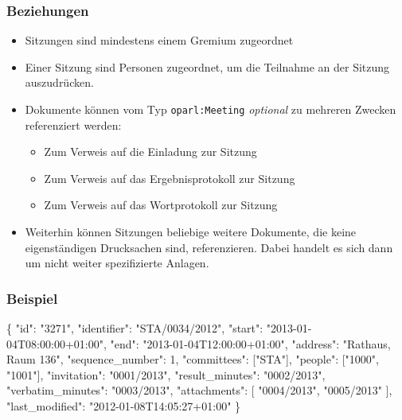 \documentclass[,a4paper]{article}
\newenvironment{Shaded}{}{}
\newcommand{\DataTypeTok}[1]{\textcolor[rgb]{0.56,0.13,0.00}{{#1}}}
\newcommand{\DecValTok}[1]{\textcolor[rgb]{0.25,0.63,0.44}{{#1}}}
\newcommand{\StringTok}[1]{\textcolor[rgb]{0.25,0.44,0.63}{{#1}}}
\newcommand{\NormalTok}[1]{{#1}}
\begin{document}
\subsubsection{Beziehungen}

\begin{itemize}
\item
  Sitzungen sind mindestens einem Gremium zugeordnet
\item
  Einer Sitzung sind Personen zugeordnet, um die Teilnahme an der
  Sitzung auszudrücken.
\item
  Dokumente können vom Typ \texttt{oparl:Meeting} \emph{optional} zu
  mehreren Zwecken referenziert werden:

  \begin{itemize}
  \item
    Zum Verweis auf die Einladung zur Sitzung
  \item
    Zum Verweis auf das Ergebnisprotokoll zur Sitzung
  \item
    Zum Verweis auf das Wortprotokoll zur Sitzung
  \end{itemize}
\item
  Weiterhin können Sitzungen beliebige weitere Dokumente, die keine
  eigenständigen Drucksachen sind, referenzieren. Dabei handelt es sich
  dann um nicht weiter spezifizierte Anlagen.
\end{itemize}

\subsubsection{Beispiel}

\begin{Shaded}
\begin{Highlighting}[]
\NormalTok{\{}
    \DataTypeTok{"id"}\NormalTok{: }\StringTok{"3271"}\NormalTok{,}
    \DataTypeTok{"identifier"}\NormalTok{: }\StringTok{"STA/0034/2012"}\NormalTok{,}
    \DataTypeTok{"start"}\NormalTok{: }\StringTok{"2013-01-04T08:00:00+01:00"}\NormalTok{,}
    \DataTypeTok{"end"}\NormalTok{: }\StringTok{"2013-01-04T12:00:00+01:00"}\NormalTok{,}
    \DataTypeTok{"address"}\NormalTok{: }\StringTok{"Rathaus, Raum 136"}\NormalTok{,}
    \DataTypeTok{"sequence_number"}\NormalTok{: }\DecValTok{1}\NormalTok{,}
    \DataTypeTok{"committees"}\NormalTok{: [}\StringTok{"STA"}\NormalTok{],}
    \DataTypeTok{"people"}\NormalTok{: [}\StringTok{"1000"}\NormalTok{, }\StringTok{"1001"}\NormalTok{],}
    \DataTypeTok{"invitation"}\NormalTok{: }\StringTok{"0001/2013"}\NormalTok{,}
    \DataTypeTok{"result_minutes"}\NormalTok{: }\StringTok{"0002/2013"}\NormalTok{,}
    \DataTypeTok{"verbatim_minutes"}\NormalTok{: }\StringTok{"0003/2013"}\NormalTok{,}
    \DataTypeTok{"attachments"}\NormalTok{: [}
        \StringTok{"0004/2013"}\NormalTok{,}
        \StringTok{"0005/2013"}
    \NormalTok{],}
    \DataTypeTok{"last_modified"}\NormalTok{: }\StringTok{"2012-01-08T14:05:27+01:00"}
\NormalTok{\}}
\end{Highlighting}
\end{Shaded}
\end{document}
